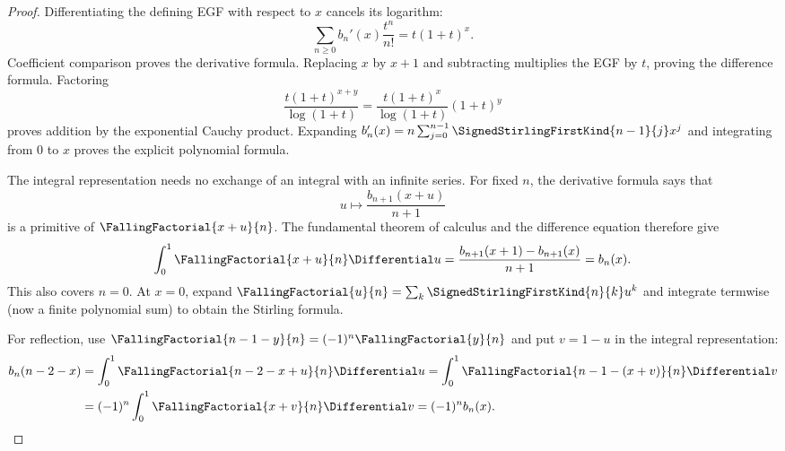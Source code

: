 \documentclass[11pt,a4paper,oneside,openany]{book}
\theoremstyle{definition}
\theoremstyle{remark}
\begin{document}
\begin{proof}
Differentiating the defining EGF with respect to $x$ cancels its logarithm:
\[
 \sum_{n\geq0}b_n'(x)\frac{t^n}{n!}
 =t(1+t)^x.
\]
Coefficient comparison proves the derivative formula.  Replacing $x$ by
$x+1$ and subtracting multiplies the EGF by $t$, proving the difference
formula.  Factoring
\[
 \frac{t(1+t)^{x+y}}{\log(1+t)}
 =\frac{t(1+t)^x}{\log(1+t)}(1+t)^y
\]
proves addition by the exponential Cauchy product.  Expanding
$b_n'(x)=n\sum_{j=0}^{n-1}\SignedStirlingFirstKind{n-1}{j}x^j$
and integrating from $0$ to $x$ proves the explicit polynomial formula.

The integral representation needs no exchange of an integral with an infinite
series.  For fixed $n$, the derivative formula says that
\[
 u\longmapsto \frac{b_{n+1}(x+u)}{n+1}
\]
is a primitive of $\FallingFactorial{x+u}{n}$.  The fundamental theorem of
calculus and the difference equation therefore give
\[
 \int_0^1\FallingFactorial{x+u}{n}\Differential u
 =\frac{b_{n+1}(x+1)-b_{n+1}(x)}{n+1}=b_n(x).
\]
This also covers $n=0$.  At $x=0$, expand
$\FallingFactorial{u}{n}=\sum_k\SignedStirlingFirstKind{n}{k}u^k$
and integrate termwise (now a finite polynomial sum) to obtain the Stirling
formula.

For reflection, use
$\FallingFactorial{n-1-y}{n}=(-1)^n\FallingFactorial{y}{n}$ and put
$v=1-u$ in the integral representation:
\begin{align*}
 b_n(n-2-x)
 &=\int_0^1\FallingFactorial{n-2-x+u}{n}\Differential u
 =\int_0^1\FallingFactorial{n-1-(x+v)}{n}\Differential v\\
 &=(-1)^n\int_0^1\FallingFactorial{x+v}{n}\Differential v
 =(-1)^n b_n(x).
\end{align*}
\end{proof}
\end{document}
